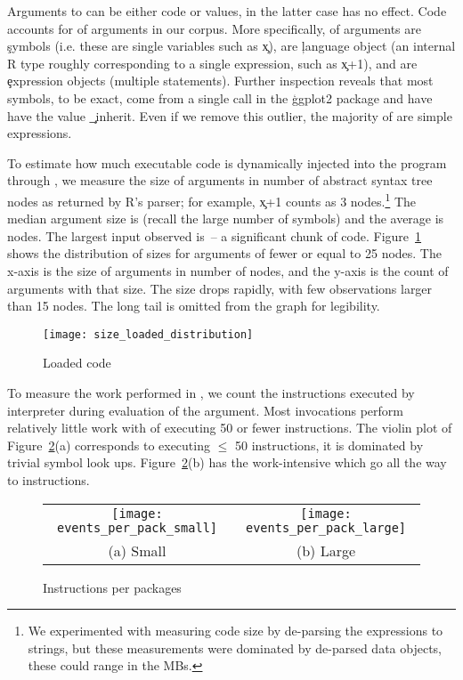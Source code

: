 \documentclass[screen,acmsmall]{acmart}
\begin{document}
Arguments to \eval can be either code or values, in the latter case
\eval has no effect. Code accounts for \Codepercent of arguments in
our corpus. More specifically, \Symbolpercent of arguments are
\c{symbol}s (i.e. these are single variables such as \c{x}),
\Languagepercent are \c{language} object (an internal R type roughly
corresponding to a single expression, such as \c{x+1}), and
\Expressionpercent are \c{expression} objects (multiple statements).
Further inspection reveals that most symbols, \Ggplotsymbolpercent to
be exact, come from a single call in the \c{ggplot2} package and have
have the value \c{\_inherit}. Even if we remove this outlier, the
majority of \evals are simple expressions.

To estimate how much executable code is dynamically injected into the
program through \eval, we measure the size of arguments in number of
abstract syntax tree nodes as returned by R's parser; for example,
\c{x+1} counts as 3 nodes.\footnote{We experimented with measuring
code size by de-parsing the expressions to strings, but these
measurements were dominated by de-parsed data objects, these could
range in the MBs.} The median argument size is \Medianszeval (recall
the large number of symbols) and the average is \Avgszeval nodes. The
largest \eval input observed is \Maxszeval\,-- a significant chunk of
code. Figure~\ref{fig:sizedistribution} shows the distribution of
sizes for arguments of fewer or equal to 25 nodes. The x-axis is the
size of arguments in number of nodes, and the y-axis is the count of
arguments with that size. The size drops rapidly, with few
observations larger than 15 nodes. The long tail is omitted from the
graph for legibility.

\begin{figure}[h!]
 \texttt{[image: size\_loaded\_distribution]}
\caption{Loaded code} \label{fig:sizedistribution}
\end{figure}

To measure the work performed in \evals, we count the instructions
executed by interpreter during evaluation of the argument.  Most invocations perform relatively little
work with \Smalleventspct of \evals executing 50 or fewer
instructions. The violin plot of Figure~\ref{ev}(a) corresponds to
\evals executing $\leq$ 50 instructions, it is dominated by trivial
symbol look ups. Figure~\ref{ev}(b) has the work-intensive \evals
which go all the way to \MaxeventsRnd instructions.

\begin{figure}[h!]
\begin{tabular}{@{}c@{}c@{}}
\begin{minipage}{7.5cm}
 \texttt{[image: events\_per\_pack\_small]}
\end{minipage}&\begin{minipage}{7.5cm}
  \texttt{[image: events\_per\_pack\_large]}
\end{minipage}\\[-3mm]
\small (a) Small & \small (b) Large
\end{tabular}
 \caption{Instructions per packages} \label{ev}
\end{figure}
\end{document}
